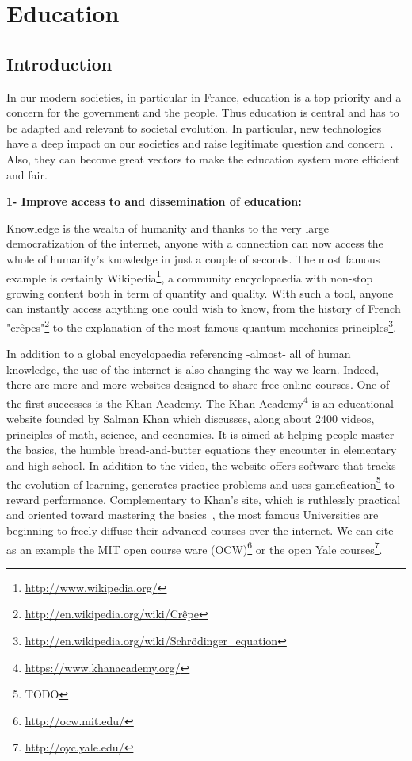 

\cleartoleftpage


\chapter{Education} %


\section{Introduction} %

In our modern societies, in particular in France, education is a top priority and a concern for the government and the people. Thus education is central and has to be adapted and relevant to societal evolution. In particular, new technologies have a deep impact on our societies and raise legitimate question and concern~\cite{plester2008txt}. Also, they can become great vectors to make the education system more efficient and fair.


\textbf{1- Improve access to  and dissemination of education:}

Knowledge is the wealth of humanity and thanks to the very large democratization of the internet, anyone with a connection can now access the whole of humanity’s knowledge in just a couple of seconds. The most famous example is certainly Wikipedia\footnote{\url{http://www.wikipedia.org/}}, a community encyclopaedia with non-stop growing content both in term of quantity and quality. With such a tool, anyone can instantly access  anything one could wish to know, from the history of French "crêpes"\footnote{\url{http://en.wikipedia.org/wiki/Crêpe}} to the explanation of the most famous quantum mechanics principles\footnote{\url{http://en.wikipedia.org/wiki/Schrödinger_equation}}.

In addition to a global encyclopaedia referencing -almost- all of human knowledge, the use of the internet is also changing the way we learn. Indeed, there are more and more websites designed to share free online courses. One of the first successes is the Khan Academy.
The Khan Academy\footnote{\url{https://www.khanacademy.org/}} is an educational website founded by Salman Khan which discusses, along about 2400 videos, principles of math, science, and economics.  It is aimed at helping people master the basics, the humble bread-and-butter equations they encounter in elementary and high school. In addition to the video, the website offers software that tracks the evolution of learning, generates practice problems and uses gamefication\footnote{TODO} to reward performance.
Complementary to Khan's site, which is ruthlessly practical and oriented toward mastering the basics~\cite{thompson2011khan}, the most famous Universities are beginning to freely diffuse their advanced courses over the internet. We can cite as an example the MIT open course ware (OCW)\footnote{\url{http://ocw.mit.edu/}} or the open Yale courses\footnote{\url{http://oyc.yale.edu/}}.

